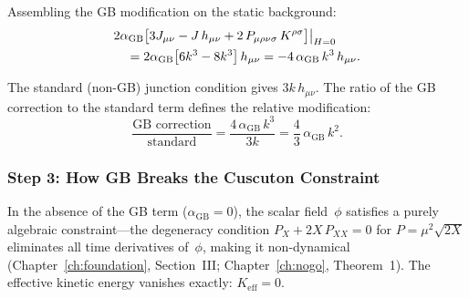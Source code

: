 Assembling the GB modification on the static background:
\begin{align}
  &2\alpha_{\mathrm{GB}}\bigl[3J_{\mu\nu} - J\, h_{\mu\nu} + 2\, P_{\mu\rho\nu\sigma}\, K^{\rho\sigma}\bigr]\big|_{H=0}
  \notag\\
  &\quad = 2\alpha_{\mathrm{GB}}\bigl[6k^3 - 8k^3\bigr]\, h_{\mu\nu}
  = -4\, \alpha_{\mathrm{GB}}\, k^3\, h_{\mu\nu}.
  \label{eq:4-gb-assembled}
\end{align}

The standard (non-GB) junction condition gives $3k\, h_{\mu\nu}$. The ratio of the GB correction to the standard term defines the relative modification:
\begin{equation}
  \frac{\text{GB correction}}{\text{standard}}
  = \frac{4\, \alpha_{\mathrm{GB}}\, k^3}{3k}
  = \frac{4}{3}\, \alpha_{\mathrm{GB}}\, k^2.
  \label{eq:4-gb-ratio}
\end{equation}


\subsubsection{Step 3: How GB Breaks the Cuscuton Constraint}

In the absence of the GB term ($\alpha_{\mathrm{GB}} = 0$), the scalar field~$\phi$ satisfies a purely algebraic constraint---the degeneracy condition $P_X + 2X\, P_{XX} = 0$ for $P = \mu^2\sqrt{2X}$ eliminates all time derivatives of~$\phi$, making it non-dynamical (Chapter~\ref{ch:foundation}, Section~III; Chapter~\ref{ch:nogo}, Theorem~1). The effective kinetic energy vanishes exactly: $K_{\mathrm{eff}} = 0$.

